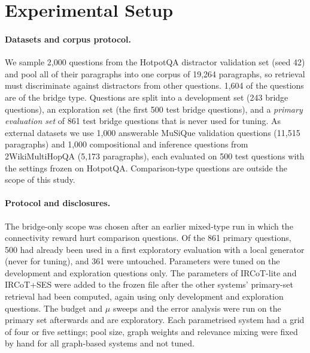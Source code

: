 \section{Experimental Setup}
\label{sec:setup}

\paragraph{Datasets and corpus protocol.}
We sample 2{,}000 questions from the HotpotQA distractor validation set (seed 42) and pool all of their paragraphs into one corpus of 19{,}264 paragraphs, so retrieval must discriminate against distractors from other questions. 1{,}604 of the questions are of the bridge type. Questions are split into a development set (243 bridge questions), an exploration set (the first 500 test bridge questions), and a \emph{primary evaluation set} of 861 test bridge questions that is never used for tuning. As external datasets we use 1{,}000 answerable MuSiQue validation questions (11{,}515 paragraphs) and 1{,}000 compositional and inference questions from 2WikiMultiHopQA (5{,}173 paragraphs), each evaluated on 500 test questions with the settings frozen on HotpotQA. Comparison-type questions are outside the scope of this study.

\paragraph{Protocol and disclosures.}
The bridge-only scope was chosen after an earlier mixed-type run in which the connectivity reward hurt comparison questions. Of the 861 primary questions, 500 had already been used in a first exploratory evaluation with a local generator (never for tuning), and 361 were untouched. Parameters were tuned on the development and exploration questions only. The parameters of IRCoT-lite and IRCoT+SES were added to the frozen file after the other systems' primary-set retrieval had been computed, again using only development and exploration questions. The budget and $\mu$ sweeps and the error analysis were run on the primary set afterwards and are exploratory. Each parametrised system had a grid of four or five settings; pool size, graph weights and relevance mixing were fixed by hand for all graph-based systems and not tuned.

